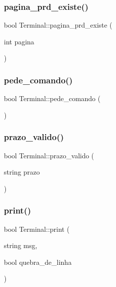 \subsubsection{\texorpdfstring{pagina\+\_\+prd\+\_\+existe()}{pagina\_prd\_existe()}}
{\footnotesize\ttfamily bool Terminal\+::pagina\+\_\+prd\+\_\+existe (\begin{DoxyParamCaption}\item[{int}]{pagina }\end{DoxyParamCaption})}

\mbox{\label{classTerminal_a7447fa08bbace168d7e3043d13ad3fa4}} 
\subsubsection{\texorpdfstring{pede\+\_\+comando()}{pede\_comando()}}
{\footnotesize\ttfamily bool Terminal\+::pede\+\_\+comando (\begin{DoxyParamCaption}{ }\end{DoxyParamCaption})}

\mbox{\label{classTerminal_a04c02a475ddfd34ab7ac354ef35b8878}} 
\subsubsection{\texorpdfstring{prazo\+\_\+valido()}{prazo\_valido()}}
{\footnotesize\ttfamily bool Terminal\+::prazo\+\_\+valido (\begin{DoxyParamCaption}\item[{string}]{prazo }\end{DoxyParamCaption})}

\mbox{\label{classTerminal_aed7124f0bc24d4b77971f16d2f186a9b}} 
\subsubsection{\texorpdfstring{print()}{print()}}
{\footnotesize\ttfamily bool Terminal\+::print (\begin{DoxyParamCaption}\item[{string}]{msg,  }\item[{bool}]{quebra\+\_\+de\+\_\+linha }\end{DoxyParamCaption})}

